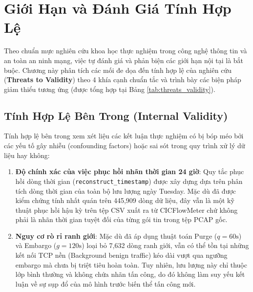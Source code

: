 
\chapter{Giới Hạn và Đánh Giá Tính Hợp Lệ}
\label{chap:han_che}

Theo chuẩn mực nghiên cứu khoa học thực nghiệm trong công nghệ thông tin và an toàn an ninh mạng, việc tự đánh giá và phản biện các giới hạn nội tại là bắt buộc. Chương này phân tích các mối đe dọa đến tính hợp lệ của nghiên cứu (\textbf{Threats to Validity}) theo 4 khía cạnh chuẩn tắc và trình bày các biện pháp giảm thiểu tương ứng (được tổng hợp tại Bảng \ref{tab:threats_validity}).



\section{Tính Hợp Lệ Bên Trong (Internal Validity)}

Tính hợp lệ bên trong xem xét liệu các kết luận thực nghiệm có bị bóp méo bởi các yếu tố gây nhiễu (confounding factors) hoặc sai sót trong quy trình xử lý dữ liệu hay không:
\begin{enumerate}
    \item \textbf{Độ chính xác của việc phục hồi nhãn thời gian 24 giờ}: Quy tắc phục hồi dòng thời gian (\texttt{reconstruct\_timestamp}) được xây dựng dựa trên phân tích dòng thời gian của toàn bộ lưu lượng ngày Tuesday. Mặc dù đã được kiểm chứng tính nhất quán trên 445,909 dòng dữ liệu, đây vẫn là một kỹ thuật phục hồi hậu kỳ trên tệp CSV xuất ra từ CICFlowMeter chứ không phải là nhãn thời gian tuyệt đối của từng gói tin trong tệp PCAP gốc.
    \item \textbf{Nguy cơ rò rỉ ranh giới}: Mặc dù đã áp dụng thuật toán Purge ($q=60\text{s}$) và Embargo ($g=120\text{s}$) loại bỏ 7,632 dòng ranh giới, vẫn có thể tồn tại những kết nối TCP nền (Background benign traffic) kéo dài vượt qua ngưỡng embargo mà chưa bị triệt tiêu hoàn toàn. Tuy nhiên, lưu lượng này chỉ thuộc lớp bình thường và không chứa nhãn tấn công, do đó không làm suy yếu kết luận về sự sụp đổ của mô hình trước biến thể tấn công mới.
\end{enumerate}

